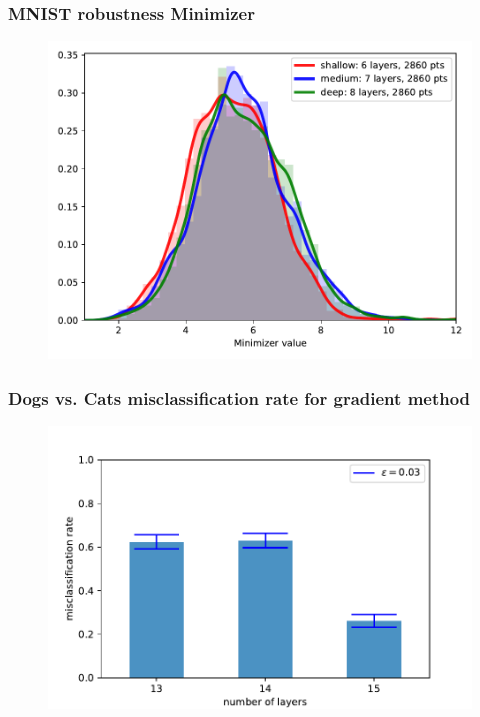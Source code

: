 \documentclass[handout]{beamer}
\begin{document}
\begin{frame}
\frametitle{MNIST robustness Minimizer} 
\begin{figure}
\includegraphics[width=0.9\linewidth]{../figures/plot_mnist_robustness_minimizer.pdf}
\end{figure}
\end{frame}

\begin{frame}
\frametitle{Dogs vs. Cats misclassification rate for gradient method} 
\begin{figure}
\includegraphics[width=0.9\linewidth]{../figures/cvd_grad_misclassificationrate.pdf}
\end{figure}
\end{frame}
\end{document}
